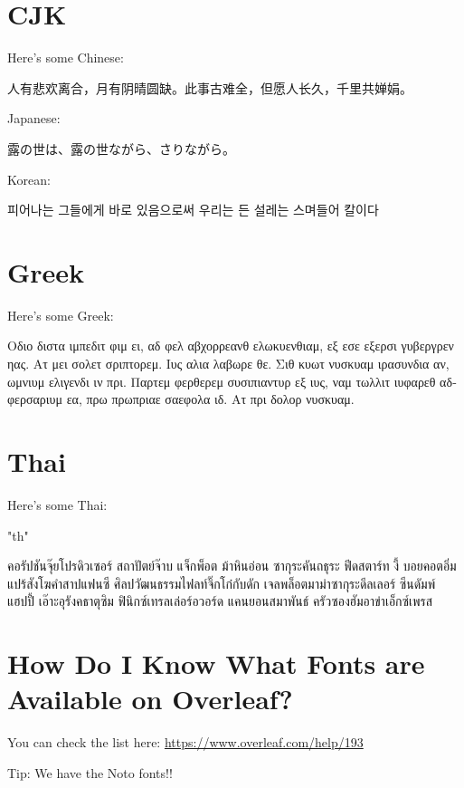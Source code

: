 \documentclass[12pt]{scrartcl}
\begin{document}
\section{CJK}
Here's some Chinese:

人有悲欢离合，月有阴晴圆缺。此事古难全，但愿人长久，千里共婵娟。


Japanese:

{\japanesefont 露の世は、露の世ながら、さりながら。}


Korean:

{\koreanfont 피어나는 그들에게 바로 있음으로써 우리는 든 설레는 스며들어 칼이다}


\section{Greek}
Here's some Greek:

\begin{greek}
Οδιο διστα ιμπεδιτ φιμ ει, αδ φελ αβχορρεανθ ελωκυενθιαμ, εξ εσε εξερσι γυβεργρεν ηας. Ατ μει σολετ σριπτορεμ. Ιυς αλια λαβωρε θε. Σιθ κυωτ νυσκυαμ ιρασυνδια αν, ωμνιυμ ελιγενδι ιν πρι. Παρτεμ φερθερεμ συσιπιαντυρ εξ ιυς, ναμ τωλλιτ ιυφαρεθ αδφερσαριυμ εα, πρω πρωπριαε σαεφολα ιδ. Ατ πρι δολορ νυσκυαμ.
\end{greek}



\section{Thai}
Here's some Thai:

\begin{thai}
\XeTeXlinebreaklocale "th"
\raggedright
คอรัปชันจุ๊ยโปรดิวเซอร์ สถาปัตย์จ๊าบ แจ็กพ็อต ม้าหินอ่อน ซากุระคันถธุระ ฟีดสตาร์ท งี้ บอยคอตอิ่มแปร้สังโฆคำสาปแฟนซี ศิลปวัฒนธรรมไฟลท์จิ๊กโก๋กับดัก เจลพล็อตมาม่าซากุระดีลเลอร์ ซีนดัมพ์ แฮปปี้ เอ๊าะอุรังคธาตุซิม ฟินิกซ์เทรลเล่อร์อวอร์ด แคนยอนสมาพันธ์ ครัวซองฮัมอาข่าเอ็กซ์เพรส
\end{thai}


\section{How Do I Know What Fonts are Available on Overleaf?}

You can check the list here: \url{https://www.overleaf.com/help/193}

Tip: We have the Noto fonts!!
\end{document}
